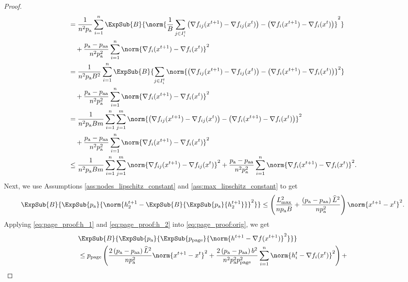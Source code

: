 \documentclass{article}
\newcommand*{\probavailable}{\ensuremath{p_{\textnormal{a}}}}
\newcommand*{\probpairaa}{\ensuremath{p_{\textnormal{aa}}}}
\newcommand*{\probpage}{\ensuremath{p_{\text{page}}}}
\begin{document}
\begin{proof}
\begin{align*}
    &= \frac{1}{n^2 \probavailable}\sum_{i=1}^n\ExpSub{B}{\norm{\frac{1}{B}\sum_{j \in I^t_i}\left(\nabla f_{ij}(x^{t+1}) - \nabla f_{ij}(x^{t})\right) - \left(\nabla f_{i}(x^{t+1}) - \nabla f_{i}(x^{t})\right)}^2} \\
    &\quad +\frac{\probavailable - \probpairaa}{n^2 \probavailable^2}\sum_{i=1}^n\norm{\nabla f_{i}(x^{t+1}) - \nabla f_{i}(x^{t})}^2 \\
    &= \frac{1}{n^2 \probavailable B^2}\sum_{i=1}^n\ExpSub{B}{\sum_{j \in I^t_i}\norm{\left(\nabla f_{ij}(x^{t+1}) - \nabla f_{ij}(x^{t})\right) - \left(\nabla f_{i}(x^{t+1}) - \nabla f_{i}(x^{t})\right)}^2} \\
    &\quad +\frac{\probavailable - \probpairaa}{n^2 \probavailable^2}\sum_{i=1}^n\norm{\nabla f_{i}(x^{t+1}) - \nabla f_{i}(x^{t})}^2 \\
    &= \frac{1}{n^2 \probavailable B m}\sum_{i=1}^n \sum_{j=1}^m \norm{\left(\nabla f_{ij}(x^{t+1}) - \nabla f_{ij}(x^{t})\right) - \left(\nabla f_{i}(x^{t+1}) - \nabla f_{i}(x^{t})\right)}^2 \\
    &\quad +\frac{\probavailable - \probpairaa}{n^2 \probavailable^2}\sum_{i=1}^n\norm{\nabla f_{i}(x^{t+1}) - \nabla f_{i}(x^{t})}^2 \\
    &\leq \frac{1}{n^2 \probavailable B m}\sum_{i=1}^n \sum_{j=1}^m \norm{\nabla f_{ij}(x^{t+1}) - \nabla f_{ij}(x^{t})}^2 +\frac{\probavailable - \probpairaa}{n^2 \probavailable^2}\sum_{i=1}^n\norm{\nabla f_{i}(x^{t+1}) - \nabla f_{i}(x^{t})}^2.
  \end{align*}
  Next, we use Assumptions \ref{ass:nodes_lipschitz_constant} and \ref{ass:max_lipschitz_constant} to get
  \begin{align}
    \ExpSub{B}{\ExpSub{\probavailable}{\norm{h^{t+1}_{2} - \ExpSub{B}{\ExpSub{\probavailable}{h^{t+1}_{2}}}}^2}} \leq \left(\frac{L_{\max}^2}{n \probavailable B} +\frac{\left(\probavailable - \probpairaa\right) \widehat{L}^2}{n \probavailable^2}\right)\norm{x^{t+1} - x^{t}}^2. \label{eq:page_proof:h_2}
  \end{align}
  Applying \eqref{eq:page_proof:h_1} and \eqref{eq:page_proof:h_2} into \eqref{eq:page_proof:orig}, we get
  \begin{align*}
    &\ExpSub{B}{\ExpSub{\probavailable}{\ExpSub{\probpage}{\norm{h^{t+1} - \nabla f(x^{t+1})}^2}}} \\
    &\leq\probpage\left(\frac{2 \left(\probavailable - \probpairaa\right) \widehat{L}^2}{n \probavailable^2} \norm{x^{t+1} - x^{t}}^2 + \frac{2\left(\probavailable - \probpairaa\right) b^2}{n^2 \probavailable^2 \probpage^2}\sum_{i=1}^n\norm{ h^t_i - \nabla f_i(x^{t})}^2\right) + \\

\end{align*}
\end{proof}
\end{document}
